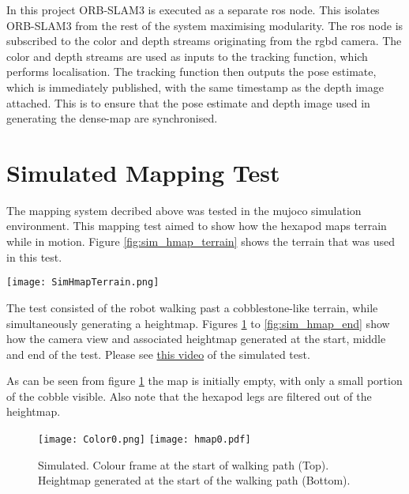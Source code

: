     In this project ORB-SLAM3 is executed as a separate \ac{ros} node. This isolates ORB-SLAM3 from the rest of the system maximising modularity. The \ac{ros} node is subscribed to the color and depth streams originating from the \ac{rgbd} camera. The color and depth streams are used as inputs to the tracking function, which performs localisation. The tracking function then outputs the pose estimate, which is immediately published, with the same timestamp as the depth image attached. This is to ensure that the pose estimate and depth image used in generating the dense-map are synchronised.

    \section{Simulated Mapping Test}\label{sec:sim_hmap}
        The mapping system decribed above was tested in the \ac{mujoco} simulation environment. This mapping test aimed to show how the hexapod maps terrain while in motion. Figure \ref{fig:sim_hmap_terrain} shows the terrain that was used in this test.
        \vspace{0.5cm}
        
        \begin{centering}
            \texttt{[image: SimHmapTerrain.png]}
            \label{fig:sim_hmap_terrain}
        \end{centering}
        
        \noindent
        The test consisted of the robot walking past a cobblestone-like terrain, while simultaneously generating a heightmap. Figures \ref{fig:sim_hmap_start} to \ref{fig:sim_hmap_end} show how the camera view and associated heightmap generated at the start, middle and end of the test. Please see \href{https://youtu.be/EgFnK6jmhdc}{this video} of the simulated test. 

        As can be seen from figure \ref{fig:sim_hmap_start} the map is initially empty, with only a small portion of the cobble visible. Also note that the hexapod legs are filtered out of the heightmap.
        \begin{figure}[h]
            \centering
            \texttt{[image: Color0.png]}
            \texttt{[image: hmap0.pdf]}
            \caption{Simulated. Colour frame at the start of walking path (Top). Heightmap generated at the start of the walking path (Bottom).}
            \label{fig:sim_hmap_start}
        \end{figure}

